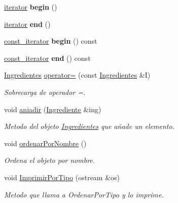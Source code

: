 \begin{DoxyCompactItemize}
\item 
\mbox{\label{classIngredientes_af714f2431abc9f391271a5ce36d20fba}} 
\hyperlink{classIngredientes_1_1iterator}{iterator} {\bfseries begin} ()
\item 
\mbox{\label{classIngredientes_a743696bb30ce1ff6d970496be6273383}} 
\hyperlink{classIngredientes_1_1iterator}{iterator} {\bfseries end} ()
\item 
\mbox{\label{classIngredientes_a18c3774d89ce0e1f12b29e381d77f795}} 
\hyperlink{classIngredientes_1_1const__iterator}{const\+\_\+iterator} {\bfseries begin} () const
\item 
\mbox{\label{classIngredientes_a952de40063794632409a027d166cd6c9}} 
\hyperlink{classIngredientes_1_1const__iterator}{const\+\_\+iterator} {\bfseries end} () const
\item 
\hyperlink{classIngredientes}{Ingredientes} \hyperlink{classIngredientes_a62ad2bb49e19ce82df5d04fe94081e9c}{operator=} (const \hyperlink{classIngredientes}{Ingredientes} \&I)
\begin{DoxyCompactList}\small\item\em Sobrecarga de operador =. \end{DoxyCompactList}\item 
void \hyperlink{classIngredientes_a05c66a6f99e091939e09ee79cd11402a}{aniadir} (\hyperlink{classIngrediente}{Ingrediente} \&ing)
\begin{DoxyCompactList}\small\item\em Metodo del objeto \hyperlink{classIngredientes}{Ingredientes} que añade un elemento. \end{DoxyCompactList}\item 
void \hyperlink{classIngredientes_a6cd27f6353a430fae6db51695dac95b5}{ordenar\+Por\+Nombre} ()
\begin{DoxyCompactList}\small\item\em Ordena el objeto por nombre. \end{DoxyCompactList}\item 
void \hyperlink{classIngredientes_a9a3accd03d7af199cd1ee99350ab5626}{Imprimir\+Por\+Tipo} (ostream \&os)
\begin{DoxyCompactList}\small\item\em Metodo que llama a Ordenar\+Por\+Tipo y lo imprime. \end{DoxyCompactList}\item 

\end{DoxyCompactItemize}

